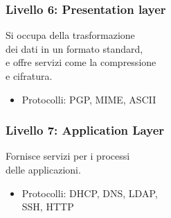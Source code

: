 \documentclass[aspectratio=169]{beamer}
\begin{document}
    \begin{frame}
      \frametitle{Livello 6: Presentation layer}%
      
      
      Si occupa della trasformazione\\ dei dati in un formato standard,\\ e offre servizi come la compressione\\ e cifratura.
      \begin{itemize}
            \item Protocolli: PGP, MIME, ASCII
       \end{itemize}
    \end{frame}
    
    \begin{frame}
      \frametitle{Livello 7: Application Layer}%
      
      
      Fornisce servizi per i processi\\delle applicazioni.
        \begin{itemize}
            \item Protocolli: DHCP, DNS, LDAP,\\SSH, HTTP
        \end{itemize}
    \end{frame}
    
\end{document}
